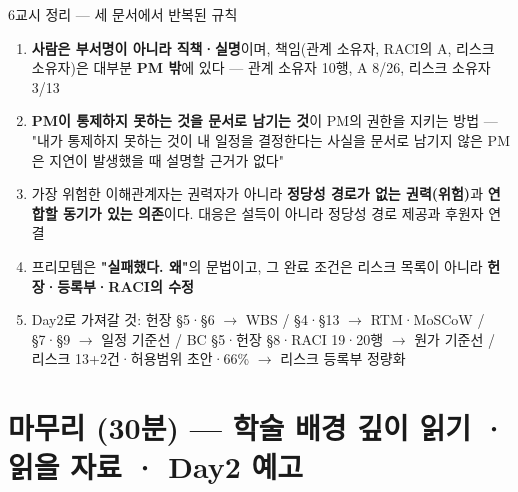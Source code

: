 \begin{frame}[allowframebreaks=1.0]{6교시 정리 — 세 문서에서 반복된 규칙}
\small
\begin{enumerate}
\item\relax \textbf{사람은 부서명이 아니라 직책·실명}이며, 책임(관계 소유자, RACI의 A, 리스크 소유자)은 대부분 \textbf{PM 밖}에 있다 — 관계 소유자 10행, A 8/26, 리스크 소유자 3/13
\item\relax \textbf{PM이 통제하지 못하는 것을 문서로 남기는 것}이 PM의 권한을 지키는 방법 — "내가 통제하지 못하는 것이 내 일정을 결정한다는 사실을 문서로 남기지 않은 PM은 지연이 발생했을 때 설명할 근거가 없다"
\item\relax 가장 위험한 이해관계자는 권력자가 아니라 \textbf{정당성 경로가 없는 권력(위험)}과 \textbf{연합할 동기가 있는 의존}이다. 대응은 설득이 아니라 정당성 경로 제공과 후원자 연결
\item\relax 프리모템은 \textbf{"실패했다. 왜"}의 문법이고, 그 완료 조건은 리스크 목록이 아니라 \textbf{헌장·등록부·RACI의 수정}
\item\relax Day2로 가져갈 것: 헌장 §5·§6 $\rightarrow$ WBS / §4·§13 $\rightarrow$ RTM·MoSCoW / §7·§9 $\rightarrow$ 일정 기준선 / BC §5·헌장 §8·RACI 19·20행 $\rightarrow$ 원가 기준선 / 리스크 13+2건·허용범위 초안·66\% $\rightarrow$ 리스크 등록부 정량화
\end{enumerate}
\end{frame}

\section{마무리 (30분) — 학술 배경 깊이 읽기 · 읽을 자료 · Day2 예고}


